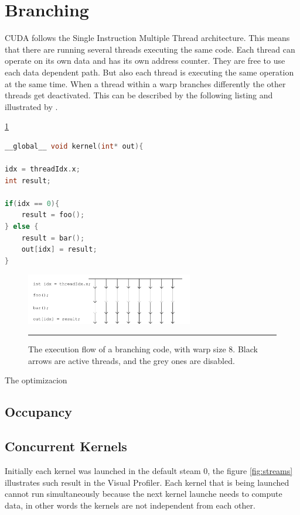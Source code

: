  
 \section{Branching}
 
 CUDA follows the Single Instruction Multiple Thread architecture. This means that there are running several threads executing the same code. Each thread can operate on its own data and has its own address counter. They are free to use each data dependent path. But also each thread is executing the same operation at the same time. When a thread within a warp branches differently the other threads get deactivated. This can be described by the following listing and illustrated by \cite{hoermanngpu}.
 
 \ref{fig:threads}
 
\begin{lstlisting}[language=C++, caption={CPU Vector Addition}]
__global__ void kernel(int* out){
 
idx = threadIdx.x;
int result;

if(idx == 0){
	result = foo();
} else {
	result = bar();
	out[idx] = result;
}
\end{lstlisting}

\begin{figure}[htbp]
	\centering
		\includegraphics[width=0.65\textwidth]{Figures/threads.png}
		\rule{35em}{0.2pt}
	\caption[he execution flow]{The execution flow of a branching code, with warp size 8. Black arrows are active threads, and the grey ones are disabled.
}
	\label{fig:threads}
\end{figure}

The optimizacion

\subsection{Occupancy}
 

\subsection{Concurrent Kernels}

Initially each kernel was launched in the default steam 0, the figure \ref{fig:streams} illustrates such result in the Visual Profiler. Each kernel that is being launched cannot run simultaneously because the next kernel launche needs to compute data, in other words the kernels are not independent from each other.

